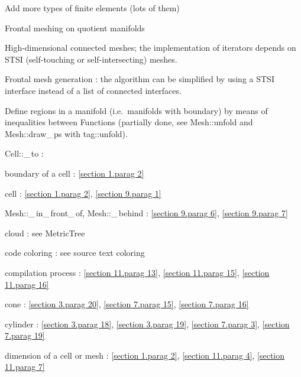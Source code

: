 \documentclass[a4paper]{scrreprt}
\def\numb{}
\newcommand\verm[1]{\textcolor{manif}{#1}}
\renewcommand\tt{\normalfont\ttfamily}
\begin{document}
\noindent Add more types of finite elements (lots of them)

\noindent Frontal meshing on quotient manifolds

\noindent High-dimensional connected meshes; the implementation of iterators depends
on STSI (self-touching or self-intersecting) meshes.

\noindent Frontal mesh generation : the algorithm can be simplified by using
a STSI interface instead of a list of connected interfaces.

\noindent Define regions in a manifold (i.e.\ manifolds with boundary) by means of
inequalities between {\small\tt\verm{Function}}s (partially done, see {\small\tt\verm{Mesh}::unfold}
and {\small\tt\verm{Mesh}::draw\_\,ps} with {\small\tt\textcolor{tag}{tag}::unfold}).





\noindent
{\small\tt\verm{Cell}::\_\,to} : 

\noindent
boundary of a cell : \ref{\numb section 1.\numb parag 2}

\noindent
cell : \ref{\numb section 1.\numb parag 2}, \ref{\numb section 9.\numb parag 1}

\noindent
{\small\tt\verm{Mesh}::\_\,in\_\,front\_\,of},
{\small\tt\verm{Mesh}::\_\,behind} : \ref{\numb section 9.\numb parag 6},
\ref{\numb section 9.\numb parag 7}

\noindent
cloud : see {\small\tt\verm{MetricTree}}

\noindent
code coloring : see source text coloring


\noindent
compilation process : \ref{\numb section 11.\numb parag 13},
\ref{\numb section 11.\numb parag 15}, \ref{\numb section 11.\numb parag 16}

\noindent
cone : \ref{\numb section 3.\numb parag 20}, \ref{\numb section 7.\numb parag 15},
\ref{\numb section 7.\numb parag 16}

\noindent
cylinder : \ref{\numb section 3.\numb parag 18}, \ref{\numb section 3.\numb parag 19},
\ref{\numb section 7.\numb parag 3}, \ref{\numb section 7.\numb parag 19}

\noindent
dimension of a cell or mesh : \ref{\numb section 1.\numb parag 2},
\ref{\numb section 11.\numb parag 4}, \ref{\numb section 11.\numb parag 7}
\end{document}

